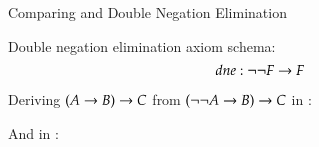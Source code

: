 \documentclass[9pt]{beamer}
\begin{document}
\begin{frame}{Comparing {\ND} and {\NDd}}{Double Negation Elimination}

Double negation elimination axiom schema:
$$
dne : \neg \neg F \imp F
$$

Deriving $(A \imp B) \imp C$ from $(\neg \neg A \imp B) \imp C$ in {\NDd}:

\begin{footnotesize}
\begin{prooftree}
		 
\end{prooftree}
\end{footnotesize}

\medskip
\medskip
\medskip
And in {\ND}:

\begin{footnotesize}
\begin{prooftree}
 
		    
	       
	 
	 
   
\end{prooftree}
\end{footnotesize}
\end{frame}
\end{document}
